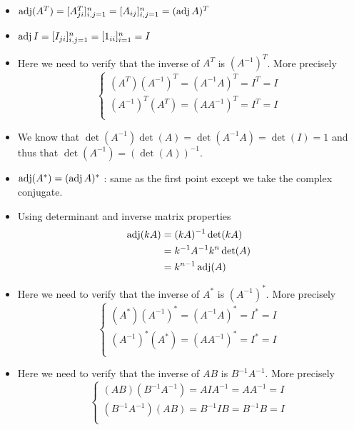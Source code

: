 \begin{solution}
  \begin{itemize}
    \item $\operatorname{adj}(A^T) = [A_{ji}^T]_{i,j=1}^n = [A_{ij}]_{i,j=1}^n = (\operatorname{adj} A)^T$
    \item $\operatorname{adj} I = [I_{ji}]_{i,j=1}^n = [1_{ii}]_{i=1}^n = I$
    \item Here we need to verify that the inverse of $A^T$ is $(A^{-1})^T$.
    More precisely
    \[
      \left\{ \begin{array}{l}
         (A^T)(A^{-1})^T = (A^{-1}A)^T = I^T = I \\
         (A^{-1})^T (A^T) = (A A^{-1})^T = I^T = I \\
      \end{array}\right.
    \]
    \item We know that $\det(A^{-1}) \det(A) = \det(A^{-1}A) = \det(I) = 1$
    and thus that $\det(A^{-1}) = (\det(A))^{-1}$.
    \item $\operatorname{adj}(A^*) = (\operatorname{adj} A)^*$ : same as the first point except we take the
    complex conjugate.
    \item Using determinant and inverse matrix properties
    \begin{align*}
      \operatorname{adj}(kA) &= (kA)^{-1} \det(kA) \\
      &= k^{-1} A^{-1} k^n \det(A) \\
      &= k^{n-1} \operatorname{adj}(A)
    \end{align*}
    \item Here we need to verify that the inverse of $A^*$ is $(A^{-1})^*$.
    More precisely
    \[
      \left\{ \begin{array}{l}
         (A^*)(A^{-1})^* = (A^{-1}A)^* = I^* = I \\
         (A^{-1})^* (A^*) = (A A^{-1})^* = I^* = I \\
      \end{array}\right.
    \]
    \item Here we need to verify that the inverse of $AB$ is $B^{-1}A^{-1}$.
    More precisely
    \[
      \left\{ \begin{array}{l}
         (AB) (B^{-1}A^{-1}) = A I A^{-1} = A A^{-1} = I \\
         (B^{-1}A^{-1}) (AB) = B^{-1} I B = B^{-1} B = I \\
      \end{array}\right.
    \]
  \end{itemize}
\end{solution}

\subsection{}
\nosolution
